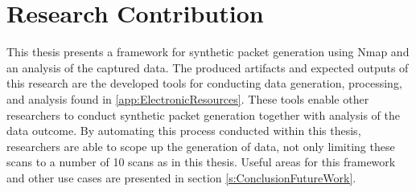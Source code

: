 \section{Research Contribution}
\label{s:ResearchContribution}
This thesis presents a framework for synthetic packet generation using Nmap and an analysis of the captured data.
The produced artifacts and expected outputs of this research are the developed tools for conducting data generation, processing, and analysis found in \ref{app:ElectronicResources}.
These tools enable other researchers to conduct synthetic packet generation together with analysis of the data outcome.
By automating this process conducted within this thesis, researchers are able to scope up the generation of data, not only limiting these scans to a number of 10 scans as in this thesis.
Useful areas for this framework and other use cases are presented in section \ref{s:ConclusionFutureWork}.
